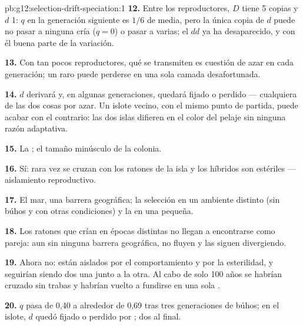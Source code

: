 \begin{solution}{pb:g12:selection-drift-speciation:1}
\textbf{12.} Entre los reproductores, $D$ tiene 5 copias y $d$ 1: $q$
en la generación siguiente es $1/6$ de media, pero la única copia de
$d$ puede no pasar a ninguna cría ($q = 0$) o pasar a varias; el
 $dd$ ya ha desaparecido, y con él buena parte de la variación.

\textbf{13.} Con tan pocos reproductores, qué  se transmiten es
cuestión de azar en cada generación; un  raro puede perderse en
una sola camada desafortunada.

\textbf{14.} $d$ derivará y, en algunas generaciones, quedará fijado o
perdido --- cualquiera de las dos cosas por azar. Un islote vecino, con
el mismo punto de partida, puede acabar con el  contrario: las dos
islas difieren en el color del pelaje sin ninguna razón adaptativa.

\textbf{15.} La ; el tamaño minúsculo de la colonia.

\textbf{16.} Sí: rara vez se cruzan con los ratones de la isla y los
híbridos son estériles --- aislamiento reproductivo.

\textbf{17.} El mar, una barrera geográfica; la selección en un
ambiente distinto (sin búhos y con otras condiciones) y la  en una  pequeña.

\textbf{18.} Los ratones que crían en épocas distintas no llegan a
encontrarse como pareja: aun sin ninguna barrera geográfica, no fluyen
 y las  siguen divergiendo.

\textbf{19.} Ahora no: están aislados por el comportamiento y por la
esterilidad, y seguirían siendo dos  una junto a la otra. Al
cabo de solo 100 años se habrían cruzado sin trabas y habrían vuelto a
fundirse en una sola .

\textbf{20.} $q$ pasa de 0,40 a alrededor de 0,69 tras tres
generaciones de búhos; en el islote, $d$ quedó fijado o perdido por
; dos  al final.
\end{solution}
